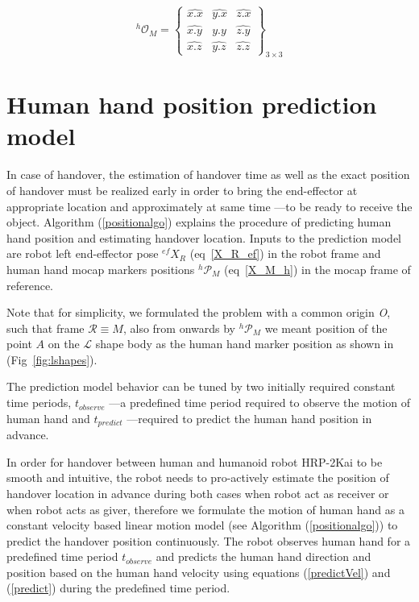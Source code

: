 \begin{equation}\label{rotationmatrix}
{}^{h}\mathcal{O}_{M} = 
\left\{\begin{array}{cccc}
\hat{x.x} & \hat{y.x} & \hat{z.x} \\
\hat{x.y} & \hat{y.y} & \hat{z.y} \\
\hat{x.z} & \hat{y.z} & \hat{z.z}
\end{array}\right\}_{3\times 3}
\end{equation}



\section{Human hand position prediction model}\label{prediction_model}

In case of handover, the estimation of handover time as well as the exact position of handover must be realized early in order to bring the end-effector at appropriate location and approximately at same time ---to be ready to receive the object. Algorithm (\ref{positionalgo}) explains the procedure of predicting human hand position and estimating handover location. Inputs to the prediction model are robot left end-effector pose $\mathcal{}^{ef}{X}_R$ (eq~\ref{X_R_ef}) in the robot frame and human hand mocap markers positions ${}^{h}\mathcal{P}_M$ (eq~\ref{X_M_h}) in the mocap frame of reference.

Note that for simplicity, we formulated the problem with a common origin {\it O}, such that frame $\mathcal R \equiv M$, also from onwards by ${}^{h}\mathcal{P}_M$ we meant position of the point $A$ on the $\mathcal{L}$ shape body as the human hand marker position as shown in (Fig~\ref{fig:lshapes}).


The prediction model behavior can be tuned by two initially required constant time periods, $t_{observe}$ ---a predefined time period required to observe the motion of human hand and $t_{predict}$ ---required to predict the human hand position in advance.


In order for handover between human and humanoid robot HRP-2Kai to be smooth and intuitive, the robot needs to pro-actively estimate the position of handover location in advance during both cases when robot act as receiver or when robot acts as giver, therefore we formulate the motion of human hand as a constant velocity based linear motion model (see Algorithm (\ref{positionalgo})) to predict the handover position continuously. The robot observes human hand for a predefined time period $t_{observe}$ and predicts the human hand direction and position based on the human hand velocity using equations (\ref{predictVel}) and (\ref{predict}) during the predefined time period. 

